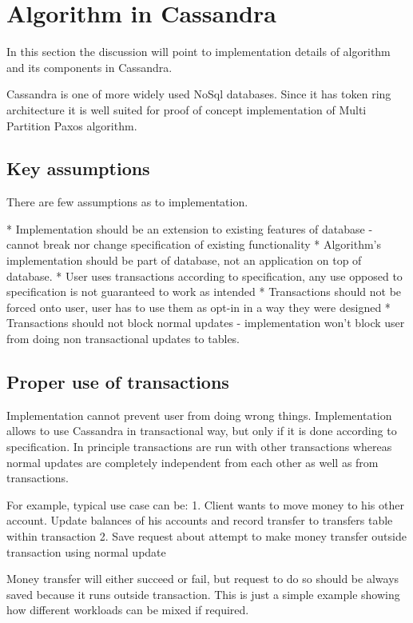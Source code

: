 \section{Algorithm in Cassandra}\label{sec:algo:c}
In this section the discussion will point to implementation details of algorithm and its components in Cassandra.

Cassandra is one of more widely used NoSql databases. Since it has token ring architecture it is well suited for proof of concept implementation of Multi Partition Paxos algorithm.


\subsection{Key assumptions}
There are few assumptions as to implementation.


* Implementation should be an extension to existing features of database - cannot break nor change specification of existing functionality
* Algorithm’s implementation should be part of database, not an application on top of database.
* User uses transactions according to specification, any use opposed to specification is not guaranteed to work as intended
* Transactions should not be forced onto user, user has to use them as opt-in in a way they were designed
* Transactions should not block normal updates - implementation won’t block user from doing non transactional updates to tables.

\subsection{Proper use of transactions}
Implementation cannot prevent user from doing wrong things. Implementation allows to use Cassandra in transactional way, but only if it is done according to specification. In principle transactions are run with other transactions whereas normal updates are completely independent from each other as well as from transactions. 


For example, typical use case can be:
1. Client wants to move money to his other account.  Update balances of his accounts and record transfer to transfers table within transaction
2. Save request about attempt to make money transfer outside transaction using normal update


Money transfer will either succeed or fail, but request to do so should be always saved because it runs outside transaction. This is just a simple example showing how different workloads can be mixed if required. 


